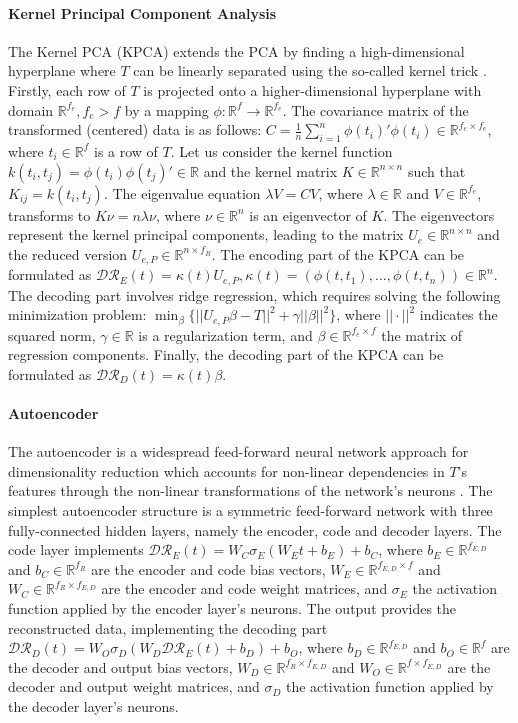 \paragraph{Kernel Principal Component Analysis} The Kernel PCA (KPCA) extends the PCA by finding a high-dimensional hyperplane where $T$ can be linearly separated using the so-called kernel trick \cite{nguyen2010kpcafd}. Firstly, each row of $T$ is projected onto a higher-dimensional hyperplane with domain $\mathbb{R}^{f_e}, f_e>f$ by a mapping $\phi: \mathbb{R}^f \rightarrow \mathbb{R}^{f_e}$. The covariance matrix of the transformed (centered) data is as follows: $C=\frac{1}{n}\sum_{i=1}^n\phi(t_i)'\phi(t_i)\in\mathbb{R}^{f_e\times f_e}$, where $t_i\in\mathbb{R}^f$ is a row of $T$. Let us consider the kernel function $k(t_i,t_j)=\phi(t_i)\phi(t_j)'\in\mathbb{R}$ and the kernel matrix $K\in\mathbb{R}^{n\times n}$ such that $K_{ij}=k(t_i,t_j)$. The eigenvalue equation $\lambda V=CV$, where $\lambda\in\mathbb{R}$ and $V\in \mathbb{R}^{f_e}$, transforms to $K\nu = n\lambda\nu$, where $\nu\in \mathbb{R}^n$ is an eigenvector of $K$. The eigenvectors represent the kernel principal components, leading to the matrix $U_e\in\mathbb{R}^{n\times n}$ and the reduced version $U_{e,P}\in\mathbb{R}^{n\times f_R}$. The encoding part of the KPCA can be formulated as $\mathcal{DR}_E(t)=\kappa(t)U_{e,P},\kappa(t)=(\phi(t,t_1),\dots,\phi(t,t_n))\in\mathbb{R}^{n}$. The decoding part involves ridge regression, which requires solving the following minimization problem: $\min_{\beta}\{||U_{e,P}\beta-T||^2+\gamma||\beta||^2\}$, where $||\cdot||^2$ indicates the squared norm, $\gamma\in\mathbb{R}$ is a regularization term, and $\beta\in\mathbb{R}^{f_e\times f}$ the matrix of regression components. Finally, the decoding part of the KPCA can be formulated as $\mathcal{DR}_{D}(t)=\kappa(t)\beta$.

\paragraph{Autoencoder} The autoencoder is a widespread feed-forward neural network approach for dimensionality reduction which accounts for non-linear dependencies in $T$'s features through the non-linear transformations of the network's neurons \cite{sakurada2014adeutoencoders}. The simplest autoencoder structure is a symmetric feed-forward network with three fully-connected hidden layers, namely the encoder, code and decoder layers. The code layer implements $\mathcal{DR}_E(t)=W_C\sigma_E(W_Et+b_E)+b_C$, where $b_E\in\mathbb{R}^{f_{E,D}}$ and $b_C\in\mathbb{R}^{f_R}$ are the encoder and code bias vectors, $W_E\in\mathbb{R}^{f_{E,D}\times f}$ and $W_C\in\mathbb{R}^{f_R \times f_{E,D}}$ are the encoder and code weight matrices, and $\sigma_E$ the activation function applied by the encoder layer's neurons. The output provides the reconstructed data, implementing the decoding part $\mathcal{DR}_D(t)=W_O\sigma_D(W_D\mathcal{DR}_E(t)+b_D)+b_O$, where $b_D\in\mathbb{R}^{f_{E,D}}$ and $b_O\in\mathbb{R}^{f}$ are the decoder and output bias vectors, $W_D\in\mathbb{R}^{f_R\times f_{E,D}}$ and $W_O\in\mathbb{R}^{f \times f_{E,D}}$ are the decoder and output weight matrices, and $\sigma_D$ the activation function applied by the decoder layer's neurons.

